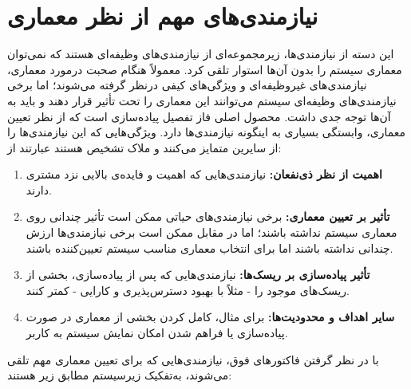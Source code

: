 \section{نیازمندی‌های مهم از نظر معماری}
این دسته از نیازمندی‌ها، زیرمجموعه‌ای از نیازمندی‌های وظیفه‌ای هستند که نمی‌توان معماری سیستم را بدون آن‌ها استوار تلقی کرد. معمولاً هنگام صحبت درمورد معماری، نیازمندی‌های غیروظیفه‌ای و ویژگی‌های کیفی درنظر گرفته می‌شوند؛ اما برخی نیازمندی‌های وظیفه‌ای سیستم می‌توانند این معماری را تحت تأثیر قرار دهند و باید به آن‌ها توجه جدی داشت. محصول اصلی فاز تفصیل پیاده‌سازی
است که از نظر تعیین معماری، وابستگی بسیاری به اینگونه نیازمندی‌ها دارد. ویژگی‌هایی که این نیازمندی‌ها را از سایرین متمایز می‌کنند و ملاک تشخیص هستند عبارتند از:
\begin{enumerate}
	\item \textbf{اهمیت از نظر ذی‌نفعان:}
	نیازمندی‌هایی که اهمیت و فایده‌ی بالایی نزد مشتری دارند.
	\item \textbf{تأثیر بر تعیین معماری:}
	برخی نیازمندی‌های حیاتی ممکن است تأثیر چندانی روی معماری سیستم نداشته باشند؛ اما در مقابل ممکن است برخی نیازمندی‌ها ارزش چندانی نداشته باشند اما برای انتخاب معماری مناسب سیستم تعیین‌کننده باشند.
	\item \textbf{تأثیر پیاده‌سازی بر ریسک‌ها:}
	نیازمندی‌هایی که پس از پیاده‌سازی، بخشی از ریسک‌های موجود را - مثلاً با بهبود دسترس‌پذیری و کارایی - کمتر کنند.
	\item \textbf{سایر اهداف و محدودیت‌ها:}
	برای مثال، کامل کردن بخشی از معماری در صورت پیاده‌سازی یا فراهم شدن امکان نمایش سیستم به کاربر.
	
\end{enumerate}

با در نظر گرفتن فاکتورهای فوق، نیازمندی‌هایی که برای تعیین معماری مهم تلقی می‌شوند، به‌تفکیک زیرسیستم مطابق زیر هستند:

